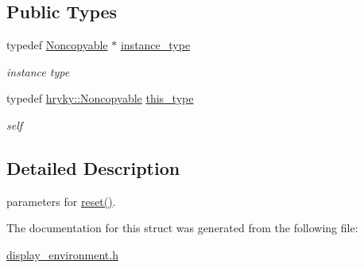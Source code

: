 \subsection*{Public Types}
\begin{DoxyCompactItemize}
\item 
\hypertarget{classhryky_1_1_noncopyable_aaf87abb55f700af85ecb0895f6178821}{typedef \hyperlink{classhryky_1_1_noncopyable}{Noncopyable} $\ast$ \hyperlink{classhryky_1_1_noncopyable_aaf87abb55f700af85ecb0895f6178821}{instance\-\_\-type}}\label{classhryky_1_1_noncopyable_aaf87abb55f700af85ecb0895f6178821}

\begin{DoxyCompactList}\small\item\em instance type \end{DoxyCompactList}\item 
\hypertarget{classhryky_1_1_noncopyable_acf13ad1c98a76247a561dff514979da5}{typedef \hyperlink{classhryky_1_1_noncopyable}{hryky\-::\-Noncopyable} \hyperlink{classhryky_1_1_noncopyable_acf13ad1c98a76247a561dff514979da5}{this\-\_\-type}}\label{classhryky_1_1_noncopyable_acf13ad1c98a76247a561dff514979da5}

\begin{DoxyCompactList}\small\item\em self \end{DoxyCompactList}\end{DoxyCompactItemize}


\subsection{Detailed Description}
parameters for \hyperlink{classhryky_1_1display_1_1_environment_ae9bf389c9271424c89a536ce16945b8f}{reset()}. 

The documentation for this struct was generated from the following file\-:\begin{DoxyCompactItemize}
\item 
\hyperlink{display__environment_8h}{display\-\_\-environment.\-h}\end{DoxyCompactItemize}

